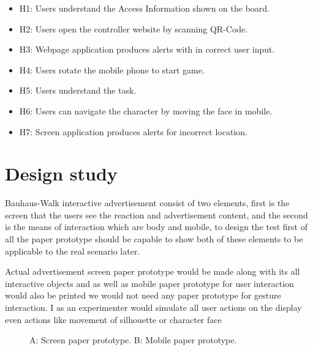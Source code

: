 \begin{itemize}
\item H1: Users understand the Access Information shown on the board.
\item H2: Users open the controller website by scanning QR-Code.
\item H3: Webpage application produces alerts with in correct user input.
\item H4: Users rotate the mobile phone to start game.
\item H5: Users understand the task.
\item H6: Users can navigate the character by moving the face in mobile.
\item H7: Screen application produces alerts for incorrect location.
\end{itemize}

\section{Design study}
Bauhaus-Walk interactive advertisement consist of two elements, first is the screen that the users see the reaction and advertisement content, and the second is the means of interaction which are body and mobile, to design the test first of all the paper prototype should be capable to show both of these elements to be applicable to the real scenario later.  

Actual advertisement screen paper prototype would be made along with its all interactive objects and as well as mobile paper prototype for user interaction would also be printed we would not need any paper prototype for gesture interaction. I as an experimenter would simulate all user actions on the display even actions like movement of silhouette or character face


\begin{figure}[H]
    \centering
    \hfill
    \caption{A: Screen paper prototype. B: Mobile paper prototype. }%
    \label{fig:paper_prototype}%
\end{figure}



